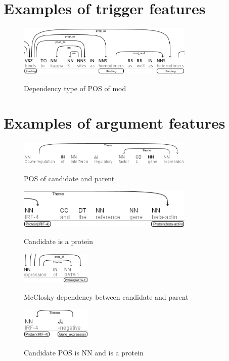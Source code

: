 \documentclass{article} %
\begin{document}
\newpage
\begin{appendices}
\section{Examples of trigger features}

\begin{figure}[H]
  \caption{Dependency type of POS of mod}
  \centering
    \includegraphics[width=0.75\textwidth]{images/trig_1.png}
      \label{fig:dep_pos_mod}
\end{figure}

\section{Examples of argument features}

\begin{figure}[H]
  \caption{POS of candidate and parent}
  \centering
    \includegraphics[width=0.75\textwidth]{images/arg_1.png}
      \label{fig:pos_candidate_parent}
\end{figure}

\begin{figure}[H]
  \caption{Candidate is a protein}
  \centering
    \includegraphics[width=0.75\textwidth]{images/arg_4.png}
      \label{fig:candidate_is_protein}
\end{figure}

\begin{figure}[H]
  \caption{McClosky dependency between candidate and parent}
  \centering
    \includegraphics[width=0.30\textwidth]{images/arg_7.png}
      \label{fig:mc_dep_candidate_parent}
\end{figure}

\begin{figure}[H]
  \caption{Candidate POS is NN and is a protein}
  \centering
    \includegraphics[width=0.30\textwidth]{images/arg_10.png}
      \label{candidate_nn_protein}
\end{figure}

\end{appendices}

{}

\end{document}
